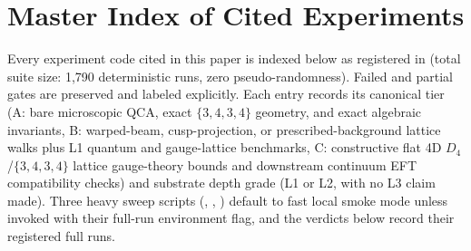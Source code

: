 \section{Master Index of Cited Experiments}
\label{sec:index}

Every experiment code cited in this paper is indexed below as registered in 
\cite{cluesurf2026repo} (total suite size: 1,790 deterministic runs, zero pseudo-randomness). Failed and partial gates
are preserved and labeled explicitly. Each entry records its canonical tier (A: bare microscopic QCA, exact
$\{3,4,3,4\}$ geometry, and exact algebraic invariants, B: warped-beam, cusp-projection, or prescribed-background
lattice walks plus L1 quantum and gauge-lattice benchmarks, C: constructive flat 4D $D_4$/$\{3,4,3,4\}$ lattice
gauge-theory bounds and downstream continuum EFT compatibility checks) and substrate depth grade (L1 or L2, with no L3
claim made). Three heavy sweep scripts (, , ) default to fast local
smoke mode unless invoked with their full-run environment flag, and the verdicts below record their registered full runs.

